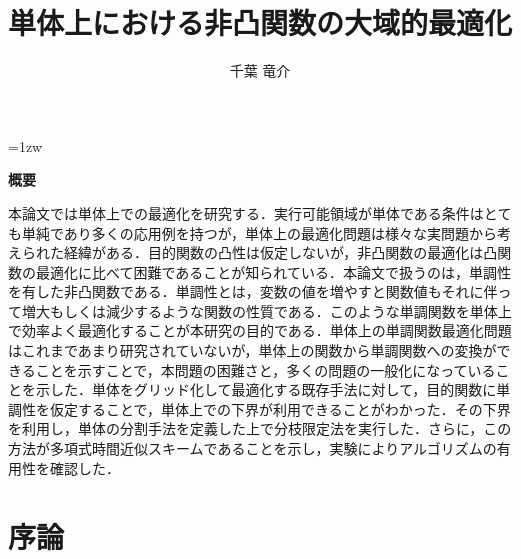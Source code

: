 \documentclass[a4paper,11pt]{jreport}
\title{単体上における非凸関数の大域的最適化}
\author{千葉 竜介}
\begin{document}
\maketitle
\thispagestyle{empty}
\newpage

\thispagestyle{empty}
\vspace*{20pt plus 1fil}
\parindent=1zw
\noindent
\begin{center}
{\bf 概要}
\vspace{5mm}
\end{center}

本論文では単体上での最適化を研究する．実行可能領域が単体である条件はとても単純であり多くの応用例を持つが，単体上の最適化問題は様々な実問題から考えられた経緯がある．目的関数の凸性は仮定しないが，非凸関数の最適化は凸関数の最適化に比べて困難であることが知られている．本論文で扱うのは，単調性を有した非凸関数である．単調性とは，変数の値を増やすと関数値もそれに伴って増大もしくは減少するような関数の性質である．このような単調関数を単体上で効率よく最適化することが本研究の目的である．単体上の単調関数最適化問題はこれまであまり研究されていないが，単体上の関数から単調関数への変換ができることを示すことで，本問題の困難さと，多くの問題の一般化になっていることを示した．単体をグリッド化して最適化する既存手法に対して，目的関数に単調性を仮定することで，単体上での下界が利用できることがわかった．その下界を利用し，単体の分割手法を定義した上で分枝限定法を実行した．さらに，この方法が多項式時間近似スキームであることを示し，実験によりアルゴリズムの有用性を確認した．

\par
\vspace{0pt plus 1fil}
\newpage

\tableofcontents
\listoffigures

\pagebreak
\setcounter{page}{1}

\chapter{序論}
\end{document}

